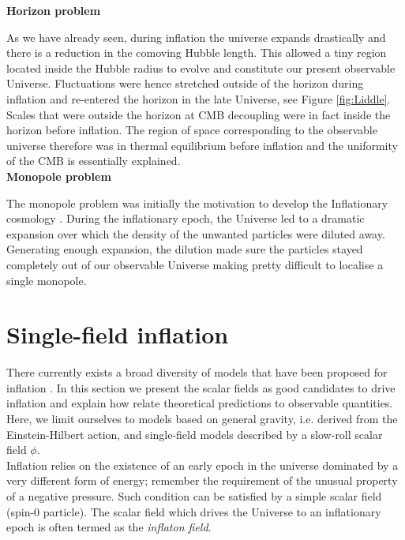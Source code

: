 \documentclass{rmaa}
\begin{document}
\vskip 16pt
\noindent
\textbf{Horizon problem}
\vskip 6pt


As we have already seen, during inflation the universe expands drastically and there is a 
reduction in the comoving Hubble length. This allowed a tiny region located inside the 
Hubble radius to evolve and constitute our present observable Universe. 
Fluctuations were hence stretched outside of the horizon during inflation and re-entered the horizon 
in the late Universe, see Figure \ref{fig:Liddle}. Scales that were outside the horizon at CMB decoupling 
were in fact inside the horizon before inflation. The region of space corresponding to the 
observable universe therefore was in thermal equilibrium before inflation and the uniformity 
of the CMB is essentially explained.
\\


\vskip 16pt
\noindent
\textbf{Monopole problem}
\vskip 6pt

The monopole problem was initially the motivation to develop the Inflationary
cosmology \citep{Guth2}.
%
During the inflationary epoch, the Universe led to a dramatic expansion
over which the density of the unwanted particles were diluted away. Generating enough
expansion, the dilution made sure the particles stayed completely out of our observable Universe
making pretty difficult to localise a single monopole.     





\section{Single-field inflation}
\vskip 6pt


There currently exists a broad diversity of models that have been proposed for inflation 
\citep{LiddleLyth, Olive, Lyth}. In this section we present the scalar fields as good candidates 
to drive inflation and explain how relate theoretical predictions to observable quantities. 
Here, we limit ourselves to models based on general gravity, i.e. derived from the
Einstein-Hilbert action, and single-field models described by a slow-roll scalar field $\phi$.
\\

Inflation relies on the existence of an early epoch in the universe dominated by a very 
different form of energy; remember the requirement of the unusual property of a negative 
pressure. Such condition can be satisfied by a simple scalar field (spin-0 particle). 
The scalar field which drives the Universe to an inflationary epoch is often termed 
as the \textit{inflaton field}. 
%
\end{document}
